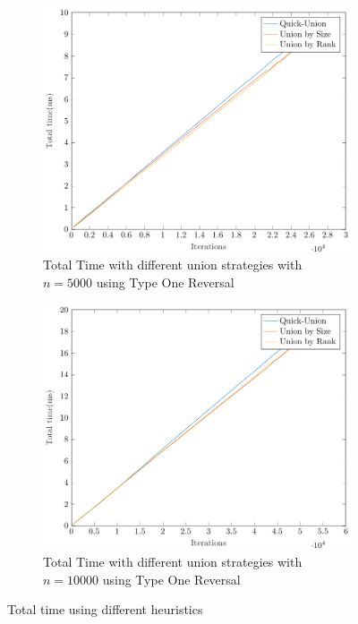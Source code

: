 \begin{figure}[ht]
    \hfill
    \begin{subfigure}{0.32\textwidth}
        \centering
        \includegraphics[width=\textwidth]{../images/plotTORFull5000_time(ms).pdf}
        \caption{Total Time with different union strategies with $n = 5000$ using Type One Reversal}
    \end{subfigure}%
    \hfill
    \begin{subfigure}{0.32\textwidth}
        \centering
        \includegraphics[width=\textwidth]{../images/plotTORFull10000_time(ms).pdf}
        \caption{Total Time with different union strategies with $n = 10000$ using Type One Reversal}
    \end{subfigure}

    \caption{Total time using different heuristics}
    \label{fig:timeH}
\end{figure}
